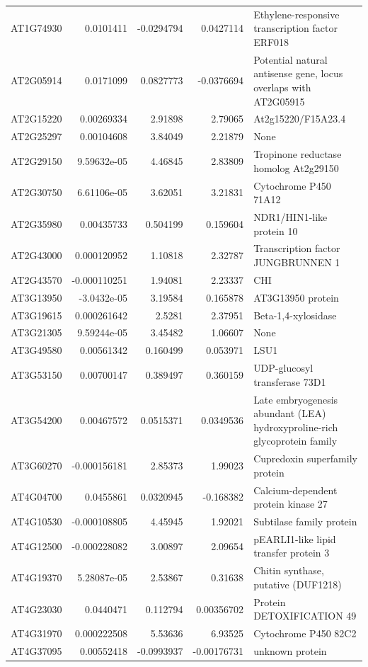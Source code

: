 \documentclass[11pt]{article}
\begin{document}
\begin{center}
\begin{tabular}{lrrrl}
AT1G74930 & 0.0101411 & -0.0294794 & 0.0427114 & Ethylene-responsive transcription factor ERF018\\
AT2G05914 & 0.0171099 & 0.0827773 & -0.0376694 & Potential natural antisense gene, locus overlaps with AT2G05915\\
AT2G15220 & 0.00269334 & 2.91898 & 2.79065 & At2g15220/F15A23.4\\
AT2G25297 & 0.00104608 & 3.84049 & 2.21879 & None\\
AT2G29150 & 9.59632e-05 & 4.46845 & 2.83809 & Tropinone reductase homolog At2g29150\\
AT2G30750 & 6.61106e-05 & 3.62051 & 3.21831 & Cytochrome P450 71A12\\
AT2G35980 & 0.00435733 & 0.504199 & 0.159604 & NDR1/HIN1-like protein 10\\
AT2G43000 & 0.000120952 & 1.10818 & 2.32787 & Transcription factor JUNGBRUNNEN 1\\
AT2G43570 & -0.000110251 & 1.94081 & 2.23337 & CHI\\
AT3G13950 & -3.0432e-05 & 3.19584 & 0.165878 & AT3G13950 protein\\
AT3G19615 & 0.000261642 & 2.5281 & 2.37951 & Beta-1,4-xylosidase\\
AT3G21305 & 9.59244e-05 & 3.45482 & 1.06607 & None\\
AT3G49580 & 0.00561342 & 0.160499 & 0.053971 & LSU1\\
AT3G53150 & 0.00700147 & 0.389497 & 0.360159 & UDP-glucosyl transferase 73D1\\
AT3G54200 & 0.00467572 & 0.0515371 & 0.0349536 & Late embryogenesis abundant (LEA) hydroxyproline-rich glycoprotein family\\
AT3G60270 & -0.000156181 & 2.85373 & 1.99023 & Cupredoxin superfamily protein\\
AT4G04700 & 0.0455861 & 0.0320945 & -0.168382 & Calcium-dependent protein kinase 27\\
AT4G10530 & -0.000108805 & 4.45945 & 1.92021 & Subtilase family protein\\
AT4G12500 & -0.000228082 & 3.00897 & 2.09654 & pEARLI1-like lipid transfer protein 3\\
AT4G19370 & 5.28087e-05 & 2.53867 & 0.31638 & Chitin synthase, putative (DUF1218)\\
AT4G23030 & 0.0440471 & 0.112794 & 0.00356702 & Protein DETOXIFICATION 49\\
AT4G31970 & 0.000222508 & 5.53636 & 6.93525 & Cytochrome P450 82C2\\
AT4G37095 & 0.00552418 & -0.0993937 & -0.00176731 & unknown protein\\

\end{tabular}
\end{center}
\end{document}
